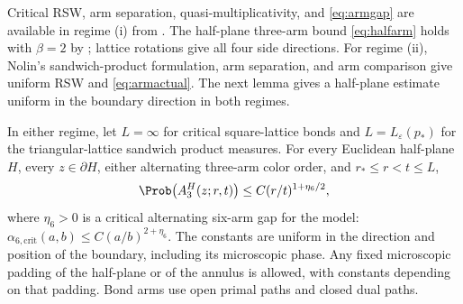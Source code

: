 Critical RSW, arm separation, quasi-multiplicativity, and \eqref{eq:armgap} are available in regime (i) from \cite[Section~2.2]{GPS}. The half-plane three-arm bound \eqref{eq:halfarm} holds with $\beta=2$ by \cite[equation~(4.12)]{GPS}; lattice rotations give all four side directions. For regime (ii), Nolin's sandwich-product formulation, arm separation, and arm comparison \cite[Definition~5, Theorems~11 and~27, Proposition~17]{Nolin} give uniform RSW and \eqref{eq:armactual}. The next lemma gives a half-plane estimate uniform in the boundary direction in both regimes.

\begin{lemma}\label{lem:reflection}
In either regime, let $L=\infty$ for critical square-lattice bonds and
$L=L_\varepsilon(p_*)$ for the triangular-lattice sandwich product measures.
For every Euclidean half-plane $H$, every $z\in\partial H$, either alternating
three-arm color order, and $r_*\le r<t\le L$,
\begin{equation}\label{eq:reflection}
 \Prob\bigl(A_3^H(z;r,t)\bigr)
 \le C(r/t)^{1+\eta_6/2},
\end{equation}
where $\eta_6>0$ is a critical alternating six-arm gap for the model:
$\alpha_{6,\mathrm{crit}}(a,b)\le C(a/b)^{2+\eta_6}$.
The constants are uniform in the direction and position of the boundary,
including its microscopic phase.  Any fixed microscopic padding of the
half-plane or of the annulus is allowed, with constants depending on that
padding.  Bond arms use open primal paths and closed dual paths.
\end{lemma}
